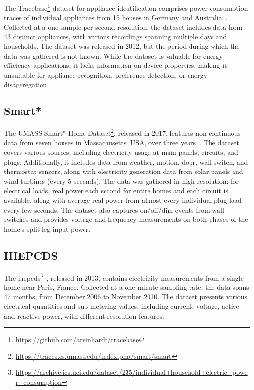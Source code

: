 The Tracebase\footnote{\url{https://github.com/areinhardt/tracebase}} dataset for appliance identification comprises power consumption traces of individual appliances from 15 houses in Germany and Australia~\parencite{reinhardtAccuracyApplianceIdentification2012}. Collected at a one-sample-per-second resolution, the dataset includes data from 43 distinct appliances, with various recordings spanning multiple days and households. The dataset was released in 2012, but the period during which the data was gathered is not known. While the dataset is valuable for energy efficiency applications, it lacks information on device properties, making it unsuitable for appliance recognition, preference detection, or energy disaggregation \parencite{himeurBuildingPowerConsumption2020}.

\subsection{Smart*}

The UMASS Smart* Home Dataset\footnote{\url{https://traces.cs.umass.edu/index.php/smart/smart}}, released in 2017, features non-continuous data from seven houses in Massachusetts, USA, over three years~\parencite{barkerSmartOpenData2012}. The dataset covers various sources, including electricity usage at main panels, circuits, and plugs. Additionally, it includes data from weather, motion, door, wall switch, and thermostat sensors, along with electricity generation data from solar panels and wind turbines (every 5 seconds). The data was gathered in high resolution: for electrical loads, real power each second for entire homes and each circuit is available, along with average real power from almost every individual plug load every few seconds. The dataset also captures on/off/dim events from wall switches and provides voltage and frequency measurements on both phases of the home’s split-leg input power.

\subsection{IHEPCDS}

The \acrlong{ihepcds}\footnote{\url{https://archive.ics.uci.edu/dataset/235/individual+household+electric+power+consumption}}~\parencite{hebrailIndividualHouseholdElectric2012}, released in 2013, contains electricity measurements from a single home near Paris, France. Collected at a one-minute sampling rate, the data spans 47 months, from December 2006 to November 2010. The dataset presents various electrical quantities and sub-metering values, including current, voltage, active and reactive power, with different resolution features.

